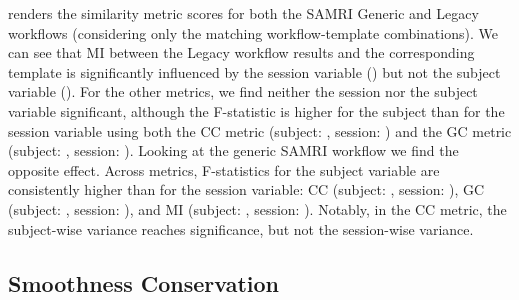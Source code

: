  renders the similarity metric scores for both the SAMRI Generic and Legacy workflows (considering only the matching workflow-template combinations).
We can see that MI between the Legacy workflow results and the corresponding template is significantly influenced by the session variable () but not the subject variable ().
For the other metrics, we find neither the session nor the subject variable significant, although the F-statistic is higher for the subject than for the session variable using both
the CC metric (subject: , session: )
and the GC metric (subject: , session: ).
Looking at the generic SAMRI workflow we find the opposite effect.
Across metrics, F-statistics for the subject variable are consistently higher than for the session variable:
CC (subject: , session: ),
GC (subject: , session: ),
and MI (subject: , session: ).
Notably, in the CC metric, the subject-wise variance reaches significance, but not the session-wise variance.

\subsection{Smoothness Conservation}

